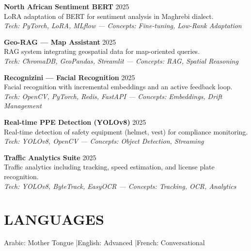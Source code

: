 \documentclass[a4paper,12pt]{article}
\begin{document}
{\textbf{North African Sentiment BERT} \hfill 2025 \\
LoRA adaptation of BERT for sentiment analysis in Maghrebi dialect. \\
\textit{Tech: PyTorch, LoRA, MLflow — Concepts: Fine-tuning, Low-Rank Adaptation}

\textbf{Geo-RAG — Map Assistant} \hfill 2025 \\
RAG system integrating geospatial data for map-oriented queries. \\
\textit{Tech: ChromaDB, GeoPandas, Streamlit — Concepts: RAG, Spatial Reasoning}

\textbf{Recognizini — Facial Recognition} \hfill 2025 \\
Facial recognition with incremental embeddings and an active feedback loop. \\
\textit{Tech: OpenCV, PyTorch, Redis, FastAPI — Concepts: Embeddings, Drift Management}

\textbf{Real-time PPE Detection (YOLOv8)} \hfill 2025 \\
Real-time detection of safety equipment (helmet, vest) for compliance monitoring. \\
\textit{Tech: YOLOv8, OpenCV — Concepts: Object Detection, Streaming}

\textbf{Traffic Analytics Suite} \hfill 2025 \\
Traffic analytics including tracking, speed estimation, and license plate recognition. \\
\textit{Tech: YOLOv8, ByteTrack, EasyOCR — Concepts: Tracking, OCR, Analytics}



} %

\section{LANGUAGES}
Arabic: Mother Tongue \quad|\quad English: Advanced \quad|\quad French: Conversational
\end{document}

